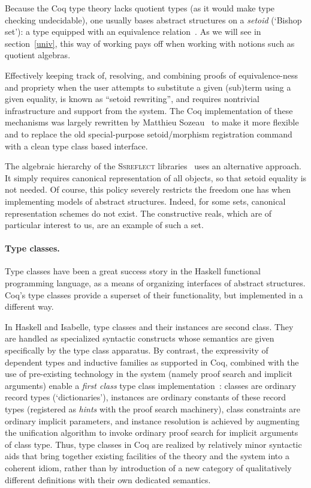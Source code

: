\documentclass[a4paper,10pt,runningheads]{llncs}
\begin{document}
Because the Coq type theory lacks quotient types (as it would make type checking undecidable), one usually bases abstract structures on a \emph{setoid} (`Bishop set'): a type equipped with an equivalence relation~\cite{Bishop67,Hofmann,Capretta}. As we will see in section~\ref{univ}, this way of working pays off when working with notions such as quotient algebras.

Effectively keeping track of, resolving, and combining proofs of equivalence-ness and propriety when the user attempts to substitute a given (sub)term using a given equality, is known as ``setoid rewriting'', and requires nontrivial infrastructure and support from the system. The Coq implementation of these mechanisms was largely rewritten by Matthieu Sozeau~\cite{Setoid-rewrite} to make it more flexible and to replace the old special-purpose setoid/morphism registration command with a clean type class based interface.

The algebraic hierarchy of the \textsc{Ssreflect} libraries~\cite{Packed} uses an alternative approach. It simply requires canonical representation of all objects, so that setoid equality is not needed. Of course, this policy severely restricts the freedom one has when implementing models of abstract structures. Indeed, for some sets, canonical representation schemes do not exist. The constructive reals, which are of particular interest to us, are an example of such a set.

\paragraph{Type classes.}

Type classes have been a great success story in the Haskell functional programming language, as a means of organizing interfaces of abstract structures. Coq's type classes provide a superset of their functionality, but implemented in a different way.

In Haskell and Isabelle, type classes and their instances are second class. They are handled as specialized syntactic constructs whose semantics are given specifically by the type class apparatus. By contrast, the expressivity of dependent types and inductive families as supported in Coq, combined with the use of pre-existing technology in the system (namely proof search and implicit arguments) enable a \emph{first class} type class implementation~\cite{DBLP:conf/tphol/SozeauO08}: classes are ordinary record types (`dictionaries'), instances are ordinary constants of these record types (registered as \emph{hints} with the proof search machinery), class constraints are ordinary implicit parameters, and instance resolution is achieved by augmenting the unification algorithm to invoke ordinary proof search for implicit arguments of class type.
Thus, type classes in Coq are realized by relatively minor syntactic aids that bring together existing facilities of the theory and the system into a coherent idiom, rather than by introduction of a new category of qualitatively different definitions with their own dedicated semantics.
\end{document}
